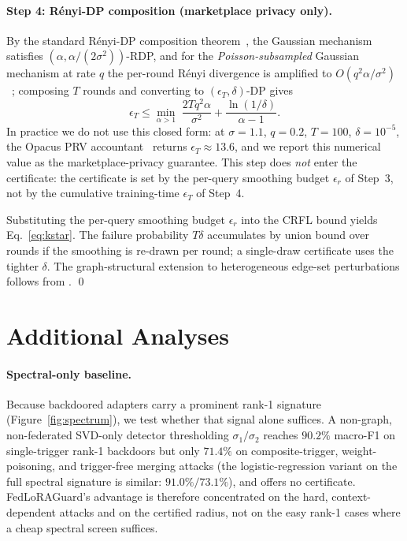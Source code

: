 \documentclass[11pt]{article}
\theoremstyle{plain}
\theoremstyle{definition}
\theoremstyle{remark}
\newcommand{\modelname}{FedLoRAGuard}
\begin{document}
\paragraph{Step 4: R\'enyi-DP composition (marketplace privacy only).}
By the standard R\'enyi-DP composition
theorem~\cite{mironov2017renyi}, the Gaussian mechanism satisfies
$(\alpha,\alpha/(2\sigma^2))$-RDP, and for the
\emph{Poisson-subsampled} Gaussian mechanism at rate $q$ the
per-round R\'enyi divergence is amplified to
$O(q^2\alpha/\sigma^2)$~\cite{mironov2019sampled}; composing $T$
rounds and converting to $(\epsilon_T,\delta)$-DP gives
\begin{equation}
\epsilon_T \leq \min_{\alpha>1}\;\frac{2 T q^2 \alpha}{\sigma^2} + \frac{\ln(1/\delta)}{\alpha - 1}.
\end{equation}
In practice we do not use this closed form: at $\sigma=1.1$,
$q=0.2$, $T=100$, $\delta=10^{-5}$, the Opacus PRV
accountant~\cite{gopi2021numerical} returns
$\epsilon_T\approx 13.6$, and we report this numerical value as
the marketplace-privacy guarantee. This step does \emph{not} enter
the certificate: the certificate is set by the per-query smoothing
budget $\epsilon_r$ of Step~3, not by the cumulative training-time
$\epsilon_T$ of Step~4.

Substituting the per-query smoothing budget $\epsilon_r$ into the
CRFL bound yields Eq.~\eqref{eq:kstar}. The failure probability
$T\delta$ accumulates by union bound over rounds if the smoothing
is re-drawn per round; a single-draw certificate uses the tighter
$\delta$. The graph-structural extension to heterogeneous edge-set
perturbations follows from
\citet{wang2021certgnn,scholten2022randomized}.
\qed

\section{Additional Analyses}
\label{app:additional}

\paragraph{Spectral-only baseline.}
Because backdoored adapters carry a prominent rank-1 signature
(Figure~\ref{fig:spectrum}), we test whether that signal alone
suffices. A non-graph, non-federated SVD-only detector thresholding
$\sigma_1/\sigma_2$ reaches $90.2\%$ macro-F1 on single-trigger
rank-1 backdoors but only $71.4\%$ on composite-trigger,
weight-poisoning, and trigger-free merging attacks (the
logistic-regression variant on the full spectral signature is
similar: $91.0\%/73.1\%$), and offers no certificate. \modelname's
advantage is therefore concentrated on the hard, context-dependent
attacks and on the certified radius, not on the easy rank-1 cases
where a cheap spectral screen suffices.
\end{document}

